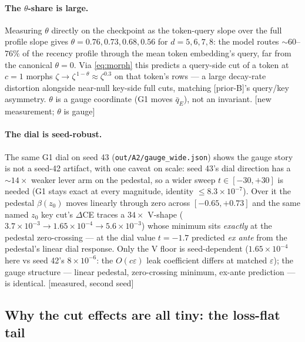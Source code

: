 \documentclass{article}
\newcommand{\bped}{\beta}
\newcommand{\htag}[1]{{\normalfont\sffamily\footnotesize[#1]}}
\newcommand{\priorB}{\textsf{[prior-B]}}
\begin{document}
\paragraph{The $\theta$-share is large.} Measuring $\theta$ directly on the
checkpoint as the token-query slope over the full profile slope gives
$\theta=0.76,0.73,0.68,0.56$ for $d=5,6,7,8$: the model routes ${\sim}60$--$76\%$ of
the recency profile through the mean token embedding's query, far from the canonical
$\theta=0$. Via \eqref{eq:morph} this predicts a query-side cut of a token at $c=1$
morphs $\zeta\to\zeta^{\,1-\theta}\approx\zeta^{0.3}$ on that token's rows --- a large
decay-rate distortion alongside near-null key-side full cuts, matching \priorB's
query/key asymmetry. $\theta$ is a gauge coordinate (G1 moves $\bar q_E$), not an
invariant. \htag{new measurement; $\theta$ is gauge}

\paragraph{The dial is seed-robust.} The same G1 dial on seed 43
(\texttt{out/A2/gauge\_wide.json}) shows the gauge story is not a seed-42 artifact, with
one caveat on scale: seed 43's dial direction has a ${\sim}14\times$ weaker lever arm on
the pedestal, so a wider sweep $t\in[-30,+30]$ is needed (G1 stays exact at every
magnitude, identity $\le8.3\times10^{-7}$). Over it the pedestal $\bped(z_0)$ moves
linearly through zero across $[-0.65,+0.73]$ and the same named $z_0$ key cut's
$\Delta$CE traces a $34\times$ V-shape
($3.7\times10^{-3}\to1.65\times10^{-4}\to5.6\times10^{-3}$) whose minimum sits
\emph{exactly} at the pedestal zero-crossing --- at the dial value $t=-1.7$ predicted
\emph{ex ante} from the pedestal's linear dial response. Only the V floor is
seed-dependent ($1.65\times10^{-4}$ here vs seed 42's $8\times10^{-6}$: the
$O(c\varepsilon)$ leak coefficient differs at matched $\varepsilon$); the gauge structure
--- linear pedestal, zero-crossing minimum, ex-ante prediction --- is identical.
\htag{measured, second seed}

\subsection{Why the cut effects are all tiny: the loss-flat tail}\label{sec:flat}
\end{document}
